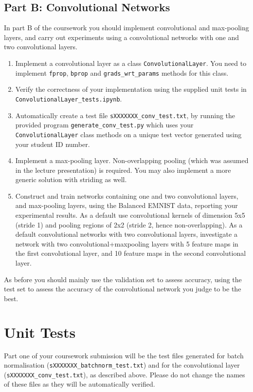 \documentclass[11pt,]{article}
\begin{document}
\subsection*{Part B: Convolutional Networks}
In part B of the coursework you should implement convolutional  and max-pooling layers, and carry out experiments using a convolutional networks with one and two convolutional layers.  
\begin{enumerate}
  \item Implement a convolutional layer as a class \verb+ConvolutionalLayer+.  You need to implement \texttt{fprop}, \texttt{bprop} and \texttt{grads\_wrt\_params} methods for this class. 
  \item Verify the correctness of your implementation using the supplied unit tests in\\\verb+ConvolutionalLayer_tests.ipynb+.
  \item Automatically create a test file \verb+sXXXXXXX_conv_test.txt+, by running the provided program \verb+generate_conv_test.py+ which uses your \verb+ConvolutionalLayer+ class methods on a unique test vector generated using your student ID number.
  \item Implement a max-pooling layer. Non-overlapping pooling (which was assumed in the lecture presentation) is required. You may also implement a more generic solution with striding as well. 
  \item Construct and train networks containing one and two convolutional layers, and max-pooling layers, using the Balanced EMNIST data, reporting your experimental results.  As a default use convolutional kernels of dimension 5x5 (stride 1) and pooling regions of 2x2 (stride 2, hence non-overlapping).  As a default convolutional networks with two convolutional layers,  investigate a network with two convolutional+maxpooling layers with 5 feature maps in the first convolutional layer, and 10 feature maps in the second convolutional layer. 
\end{enumerate}
As before you should mainly use the validation set to assess accuracy, using the test set to assess the accuracy of the convolutional network you judge to be the best.






\section{Unit Tests}
\label{sec:tests}
Part one of your coursework submission will be the test files generated for batch normalisation (\verb+sXXXXXXX_batchnorm_test.txt+) and for the convolutional layer (\verb+sXXXXXXX_conv_test.txt+), as described above.  Please do not change the names of these files as they will be automatically verified.
\end{document}
